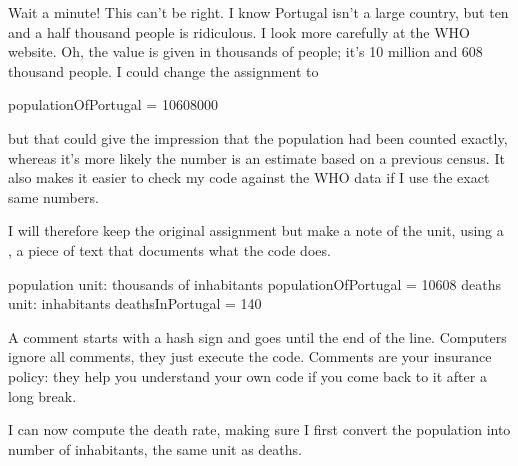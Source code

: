 \documentclass[letterpaper,10pt,english]{sphinxmanual}
\begin{document}
Wait a minute! This can’t be right. I know Portugal isn’t a large country, but ten and a half thousand people is ridiculous. I look more carefully at the WHO website. Oh, the value is given in thousands of people; it’s 10 million and 608 thousand people. I could change the assignment to


{
\begin{sphinxVerbatim}[commandchars=\\\{\}]
\llap{\color{nbsphinxin}[ ]:\,\hspace{\fboxrule}\hspace{\fboxsep}}
populationOfPortugal = 10608000
\end{sphinxVerbatim}
}

but that could give the impression that the population had been counted exactly, whereas it’s more likely the number is an estimate based on a previous census. It also makes it easier to check my code against the WHO data if I use the exact same numbers.

I will therefore keep the original assignment but make a note of the unit, using a  , a piece of text that documents what the code does.


{
\begin{sphinxVerbatim}[commandchars=\\\{\}]
\llap{\color{nbsphinxin}[ ]:\,\hspace{\fboxrule}\hspace{\fboxsep}}
\PYGZsh{} population unit: thousands of inhabitants
populationOfPortugal = 10608
\PYGZsh{} deaths unit: inhabitants
deathsInPortugal = 140
\end{sphinxVerbatim}
}

A comment starts with a hash sign \sphinxstylestrong{(\#)} and goes until the end of the line. Computers ignore all comments, they just execute the code. Comments are your insurance policy: they help you understand your own code if you come back to it after a long break.

I can now compute the death rate, making sure I first convert the population into number of inhabitants, the same unit as deaths.
\end{document}
